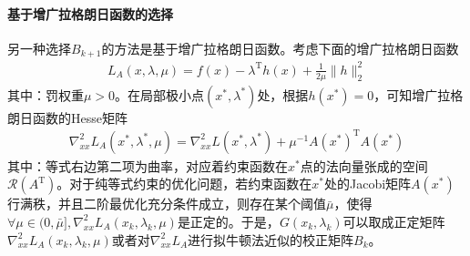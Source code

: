             \paragraph{基于增广拉格朗日函数的选择}
            另一种选择$B_{k+1}$的方法是基于增广拉格朗日函数。考虑下面的增广拉格朗日函数
            \begin{align*}
             L_A(x,\lambda,\mu)=f(x)-{\lambda}^\mathrm{T} h(x)+\frac{1}{2\mu}\|h\|_2^2
            \end{align*}
            其中：罚权重$\mu > 0$。在局部极小点$(x^*,{\lambda}^*)$处，根据$h(x^*)=0$，可知增广拉格朗日函数的Hesse矩阵
            \begin{align*}
             {\nabla}^2_{xx}L_A(x^*,{\lambda}^*,{\mu})={\nabla}^2_{xx}L(x^*,{\lambda}^*)+{\mu}^{-1}A(x^*)^\mathrm{T} A(x^*)
            \end{align*}
            其中：等式右边第二项为曲率，对应着约束函数在$x^*$点的法向量张成的空间$\mathcal{R}(A^\mathrm{T} )$。对于纯等式约束的优化问题，若约束函数在$x^*$处的Jacobi矩阵$A(x^*)$行满秩，并且二阶最优化充分条件成立，则存在某个阈值$\bar{\mu}$，使得$\forall \mu \in (0,\bar{\mu}],{\nabla}^2_{xx}L_A(x_k,{\lambda}_k,{\mu})$是正定的。于是，$G(x_k,{\lambda}_k)$可以取成正定矩阵${\nabla}^2_{xx}L_A(x_k,{\lambda}_k,{\mu})$或者对${\nabla}^2_{xx}L_A$进行拟牛顿法近似的校正矩阵$B_k$。
